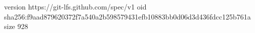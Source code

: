 version https://git-lfs.github.com/spec/v1
oid sha256:f9aad879620372f7a540a2b598579431efb10883bb0d06d3d436fdcc125b761a
size 928
